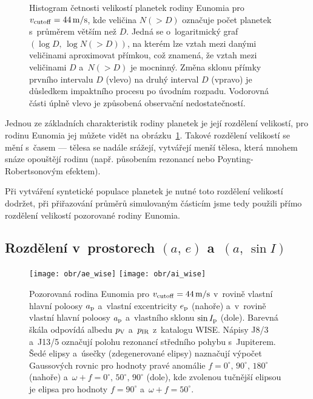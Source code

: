 \documentclass[A4paper, 12pt, oneside]{book}
\begin{document}
\begin{figure}
\begin{subfigure}[b]{0.45\textwidth}
	\end{subfigure}
	\caption{Histogram četnosti velikostí planetek rodiny Eunomia pro $v_{\rm cutoff}=44\,{\rm m/s}$, kde veličina $N({>}D)$ označuje počet planetek s~průměrem větším než $D$. Jedná se o~logaritmický graf $(\log D,\,\log N({>}D))$, na kterém lze vztah mezi danými veličinami aproximovat přímkou, což znamená, že vztah mezi veličinami $D$ a~$N({>}D)$ je mocninný. Změna sklonu přímky prvního intervalu $D$ (vlevo) na druhý interval $D$ (vpravo) je důsledkem impaktního procesu po úvodním rozpadu. Vodorovná části úplně vlevo je způsobená observační nedostatečností.}
	\label{fig:sfd}
\end{figure}

Jednou ze základních charakteristik rodiny planetek je její rozdělení velikostí, pro rodinu Eunomia jej můžete vidět na obrázku~\ref{fig:sfd}. Takové rozdělení velikostí se mění s~časem --- tělesa se nadále srážejí, vytvářejí menší tělesa, která mnohem snáze opouštějí rodinu (např. působením rezonancí nebo Poynting-Robertsonovým efektem).

Při vytváření syntetické populace planetek je nutné toto rozdělení velikostí dodržet, při přiřazování průměrů simulovaným částicím jsme tedy použili přímo rozdělení velikostí pozorované rodiny Eunomia.

\subsection{Rozdělení v~prostorech $(a,\,e)$ a~$(a,\,\sin I)$}
\begin{figure}
	\centering
	\texttt{[image: obr/ae\_wise]}
	\texttt{[image: obr/ai\_wise]}
	\caption{Pozorovaná rodina Eunomia pro $v_{\rm cutoff} = 44\,{\rm m/s}$ v~rovině vlastní hlavní poloosy $a_{\rm p}$ a~vlastní excentricity $e_{\rm p}$ (nahoře) a~v~rovině vlastní hlavní poloosy $a_{\rm p}$ a~vlastního sklonu $\sin I_{\rm p}$ (dole). Barevná škála odpovídá albedu $p_{\rm V}$ a~$p_{\rm IR}$ z~katalogu WISE\@. Nápisy J8/3 a~J13/5 označují polohu rezonancí středního pohybu s~Jupiterem. Šedé elipsy a~úsečky (zdegenerované elipsy) naznačují výpočet Gaussových rovnic pro hodnoty pravé anomálie $f=0^\circ,\,90^\circ,\,180^\circ$ (nahoře) a~$\omega+f=0^\circ,\, 50^\circ,\, 90^\circ$ (dole), kde zvolenou tučnější elipsou je elipsa pro hodnoty $f=90^\circ$ a~$\omega+f=50^\circ$.}
	\label{fig:ae_ai_wise}
\end{figure}
\end{document}
